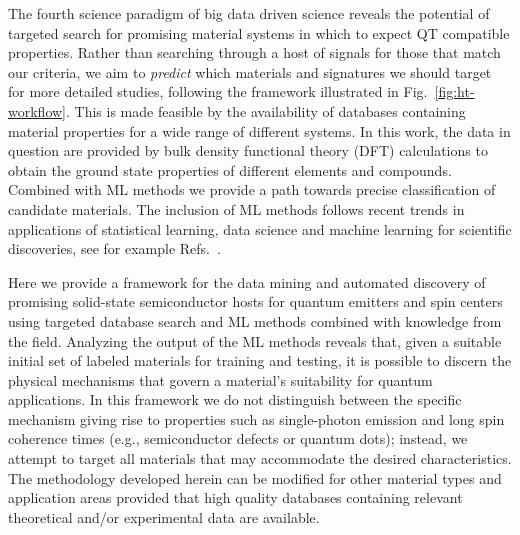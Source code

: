 \documentclass[superscriptaddress,unsortedaddress,
 amsmath,amssymb,
 aps,
]{revtex4-2}
\begin{document}
The fourth science paradigm of big data driven science reveals the potential of targeted search for promising material systems in which to expect QT compatible properties. 
Rather than searching through a host of signals for those that match our criteria, we aim to \textit{predict} which materials and signatures we should target for more detailed studies, following the framework illustrated in Fig.~\ref{fig:ht-workflow}. 
This is made feasible by the availability of databases containing material properties for a wide range of different systems. In this work, the data in question are provided by bulk density functional theory (DFT) calculations to obtain the ground state properties of different elements and compounds. Combined with ML methods we provide a path towards precise classification of candidate materials. The inclusion of ML methods follows recent trends in applications of statistical learning, data science and machine learning for scientific discoveries, see for example Refs.~\cite{deiana2021,Carleo2019}. 

Here we provide a framework for the data mining and automated discovery of promising solid-state semiconductor hosts for quantum emitters and spin centers using targeted database search and ML methods combined with knowledge from the field. 
Analyzing the output of the ML methods reveals that, given a suitable initial set of labeled materials for training and testing, it is possible to discern the physical mechanisms that govern a material's suitability for quantum applications.  
In this framework we do not distinguish between the specific mechanism giving rise to properties such as single-photon emission and long spin coherence times (e.g., semiconductor defects or quantum dots); instead, we attempt to target all materials that may accommodate the desired characteristics.  
The methodology developed herein can be modified for other material types and application areas provided that high quality databases containing relevant theoretical and/or experimental data are available. 
\end{document}
